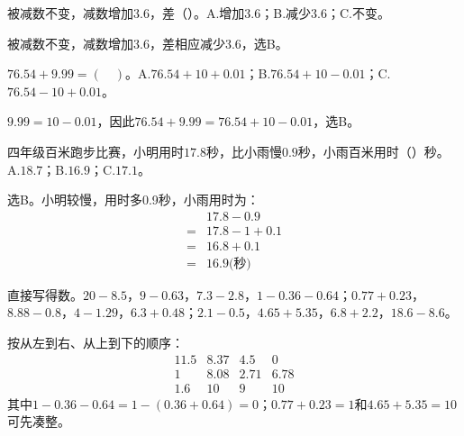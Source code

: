 被减数不变，减数增加\(3.6\)，差（\hspace{1.8em}）。A.增加\(3.6\)；B.减少\(3.6\)；C.不变。\par
\begin{BookAnswer}
被减数不变，减数增加3.6，差相应减少3.6，选B。
\end{BookAnswer}

\(76.54+9.99=(\quad)\)。A.\(76.54+10+0.01\)；B.\(76.54+10-0.01\)；C.\(76.54-10+0.01\)。\par
\begin{BookAnswer}
\(9.99=10-0.01\)，因此\(76.54+9.99=76.54+10-0.01\)，选B。
\end{BookAnswer}

四年级百米跑步比赛，小明用时\(17.8\)秒，比小雨慢\(0.9\)秒，小雨百米用时（\hspace{1.8em}）秒。A.\(18.7\)；B.\(16.9\)；C.\(17.1\)。\par
\begin{BookAnswer}
选B。小明较慢，用时多0.9秒，小雨用时为：\[\begin{aligned}&17.8-0.9\\={}&17.8-1+0.1\\={}&16.8+0.1\\={}&16.9\text{(秒)}\end{aligned}\]
\end{BookAnswer}

直接写得数。\(20-8.5\)，\allowbreak{}\(9-0.63\)，\allowbreak{}\(7.3-2.8\)，\allowbreak{}\(1-0.36-0.64\)；\allowbreak{}\(0.77+0.23\)，\allowbreak{}\(8.88-0.8\)，\allowbreak{}\(4-1.29\)，\allowbreak{}\(6.3+0.48\)；\allowbreak{}\(2.1-0.5\)，\allowbreak{}\(4.65+5.35\)，\allowbreak{}\(6.8+2.2\)，\allowbreak{}\(18.6-8.6\)。\par
\begin{BookAnswer}
按从左到右、从上到下的顺序：\[\begin{array}{rrrr}11.5&8.37&4.5&0\\1&8.08&2.71&6.78\\1.6&10&9&10\end{array}\]其中\(1-0.36-0.64=1-(0.36+0.64)=0\)；\allowbreak{}\(0.77+0.23=1\)和\(4.65+5.35=10\)可先凑整。
\end{BookAnswer}

